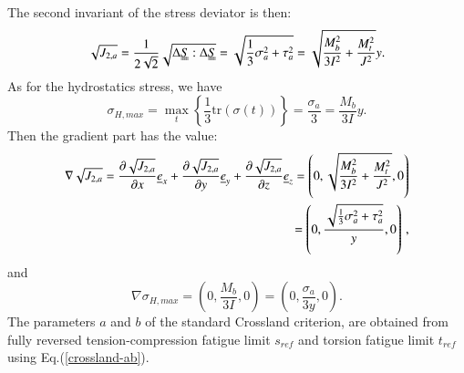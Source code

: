 \documentclass[3p,times,procedia,number]{elsarticle}
\begin{document}
The second invariant of the stress deviator is then:
\begin{equation}
\sqrt{J_{2,a}}=\dfrac{1}{2\sqrt{2}}\sqrt{\Delta \uuline{S}:\Delta \uuline{S}}=\sqrt{\dfrac{1}{3}\sigma_a^2+\tau_a^2}=\sqrt{\dfrac{M_b^2}{3I^2}+\dfrac{M_t^2}{J^2}}y.
\end{equation}
As for the  hydrostatics stress, we have
\begin{equation}
\sigma_{H,max}=\max\limits_{t}\left\lbrace \dfrac{1}{3}\textrm{tr}(\sigma(t))\right\rbrace =\dfrac{\sigma_{a}}{3}=\dfrac{M_b}{3I}y .
\end{equation}
Then the gradient part has the value:
\begin{equation}
\begin{split}
\nabla\sqrt{J_{2,a}}=\dfrac{\partial\sqrt{J_{2,a}}}{\partial x}\uline{e}_x+\dfrac{\partial\sqrt{J_{2,a}}}{\partial y}\uline{e}_y+\dfrac{\partial\sqrt{J_{2,a}}}{\partial z}\uline{e}_z=\left( 0,\sqrt{\dfrac{M_b^2}{3I^2}+\dfrac{M_t^2}{J^2}},0\right) \\=\left( 0,\dfrac{\sqrt{\frac{1}{3}\sigma_a^2+\tau_a^2}}{y},0\right) \, ,
\end{split}
\end{equation}
and
\begin{equation}
\nabla \sigma_{H,max}=\left( 0,\dfrac{M_b}{3I},0\right) =\left( 0,\dfrac{\sigma_a}{3y},0\right) .
\end{equation}
The parameters $a$ and $b$ of the standard Crossland criterion, are obtained from fully reversed tension-compression fatigue limit $s_{ref}$  and torsion fatigue limit $t_{ref}$ using Eq.(\ref{crossland-ab}).
\end{document}
